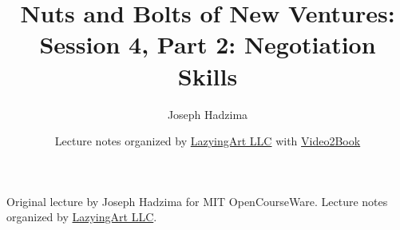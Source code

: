 \documentclass[11pt,oneside]{book}
\begin{document}
\frontmatter
\title{Nuts and Bolts of New Ventures: Session 4, Part 2: Negotiation Skills}
\author{Joseph Hadzima}
\date{Lecture notes organized by \href{https://lazying.art}{LazyingArt LLC} with \href{https://github.com/lachlanchen/Video2Book}{Video2Book}}
\maketitle
\begin{center}
\small Original lecture by Joseph Hadzima for MIT OpenCourseWare. Lecture notes organized by \href{https://lazying.art}{LazyingArt LLC}.
\end{center}
\clearpage
\mainmatter

\end{document}
